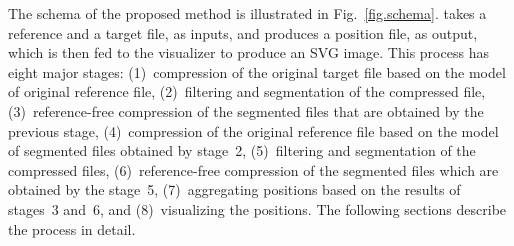 
The schema of the proposed method is illustrated in Fig.~\ref{fig.schema}. \smashpp takes a reference and a target file, as inputs, and produces a position file, as output, which is then fed to the \smashpp visualizer to produce an SVG image. This process has eight major stages: (1)~compression of the original target file based on the model of original reference file, (2)~filtering and segmentation of the compressed file, (3)~reference-free compression of the segmented files that are obtained by the previous stage, (4)~compression of the original reference file based on the model of segmented files obtained by stage~2, (5)~filtering and segmentation of the compressed files, (6)~reference-free compression of the segmented files which are obtained by the stage~5, (7)~aggregating positions based on the results of stages~3 and~6, and (8)~visualizing the positions. The following sections describe the process in detail.

